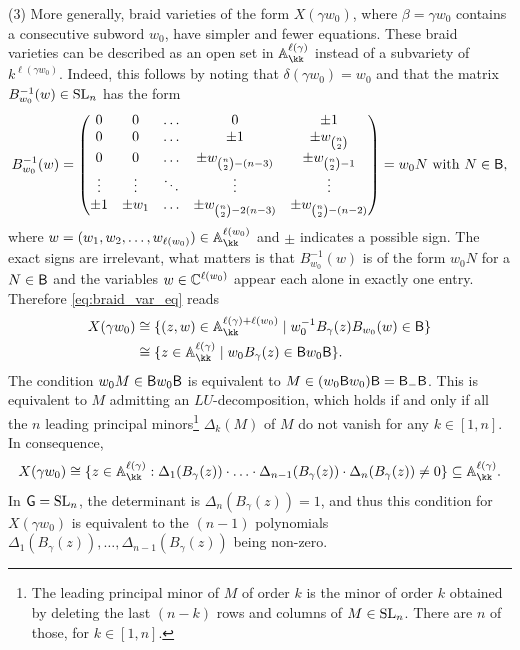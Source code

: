 \begin{example}
\noindent (3) More generally, braid varieties of the form $X(\gamma w_0)$, where $\beta=\gamma w_0$ contains a consecutive subword $w_0$, have simpler and fewer equations. These braid varieties can be described as an open set in $\mathbb{A}_\kk^{\ell(\gamma)}$ instead of a subvariety of $k^{\ell(\gamma w_0)}$. Indeed, this follows by noting that $\delta(\gamma w_0)=w_0$ and that the matrix $B_{w_0}^{-1}(w)\in\operatorname{SL}_n$ has the form
$$B_{w_0}^{-1}(w)=\left(\begin{matrix} 0 & 0 & \ldots & 0 & \pm1\\ 
0 & 0 &  \ldots & \pm1 & \pm w_{\binom{n}{2}} \\ 0 &  0 & \ldots & \pm w_{\binom{n}{2}-(n-3)} & \pm w_{\binom{n}{2}-1} \\ 
\vdots & \vdots & \ddots & \vdots & \vdots \\ \pm1 & \pm w_{1} & \ldots & \pm w_{\binom{n}{2}-2(n-3)} & \pm w_{\binom{n}{2}-(n-2)}
\end{matrix}\right)=w_0N\mbox{ with } N\in\mathsf{B},$$
where $w=(w_1,w_2,\ldots,w_{\ell(w_0)})\in \mathbb{A}_\kk^{\ell(w_0)}$ and $\pm$ indicates a possible sign. The exact signs are irrelevant, what matters is that $B_{w_0}^{-1}(w)$ is of the form $w_0N$ for a $N\in\mathsf{B}$ and the variables $w\in\mathbb{C}^{\ell(w_0)}$ appear each alone in exactly one entry. Therefore \cref{eq:braid_var_eq} reads
\begin{align*}
X(\gamma w_0) & \cong \{(z,w) \in \mathbb{A}_\kk^{\ell(\gamma)+\ell(w_0)} \mid w_0^{-1}B_\gamma(z)B_{w_0}(w) \in \borel\}\\
         & \cong \{z \in \mathbb{A}_\kk^{\ell(\gamma)} \mid w_0B_\gamma(z) \in \borel w_0\borel\}.
\end{align*}
\noindent The condition $w_0 M\in\mathsf{B} w_0\mathsf{B}$ is equivalent to $M\in (w_0\mathsf{B} w_0)\mathsf{B}=\mathsf{B}_-\mathsf{B}$. This is equivalent to $M$ admitting an $LU$-decomposition, which holds if and only if all the $n$ leading principal minors\footnote{The leading principal minor of $M$ of order $k$ is the minor of order $k$ obtained by deleting the last
$(n-k)$ rows and columns of $M\in\operatorname{SL}_n$. There are $n$ of those, for $k\in[1,n]$.} $\Delta_k(M)$ of $M$ do not vanish for any $k\in[1,n]$. In consequence,
$$X(\gamma w_0)\cong\{z\in \mathbb{A}_\kk^{\ell(\gamma)}: \Delta_1(B_\gamma(z))\cdot\ldots\cdot\Delta_{n-1}(B_\gamma(z))\cdot\Delta_{n}(B_\gamma(z))\neq0\}\sse \mathbb{A}_\kk^{\ell(\gamma)}.$$
\noindent In $\mathsf{G}=\operatorname{SL}_n$, the determinant is $\Delta_n(B_\gamma(z))=1$, and thus this condition for $X(\gamma w_0)$ is equivalent to the $(n-1)$ polynomials $\Delta_1(B_\gamma(z)),\ldots,\Delta_{n-1}(B_\gamma(z))$ being non-zero.
\sbs
\end{example}

